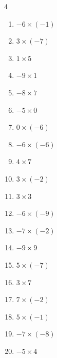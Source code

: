 \begin{multicols}{4}
\begin{enumerate}
  \item $-6\times (-1)$
        \phantom{$=6$}

  \item $3\times (-7)$
        \phantom{$=-21$}

  \item $1\times 5$
        \phantom{$=5$}

  \item $-9\times 1$
        \phantom{$=-9$}

  \item $-8\times 7$
        \phantom{$=-56$}

  \item $-5\times 0$
        \phantom{$=0$}

  \item $0\times (-6)$
        \phantom{$=0$}

  \item $-6\times (-6)$
        \phantom{$=36$}

  \item $4\times 7$
        \phantom{$=28$}

  \item $3\times (-2)$
        \phantom{$=-6$}

  \item $3\times 3$
        \phantom{$=9$}

  \item $-6\times (-9)$
        \phantom{$=54$}

  \item $-7\times (-2)$
        \phantom{$=14$}

  \item $-9\times 9$
        \phantom{$=-81$}

\columnbreak %

  \item $5\times (-7)$
        \phantom{$=-35$}

  \item $3\times 7$
        \phantom{$=21$}

  \item $7\times (-2)$
        \phantom{$=-14$}

  \item $5\times (-1)$
        \phantom{$=-5$}

  \item $-7\times (-8)$
        \phantom{$=56$}

  \item $-5\times 4$
        \phantom{$=-20$}


\end{enumerate}
\end{multicols}
